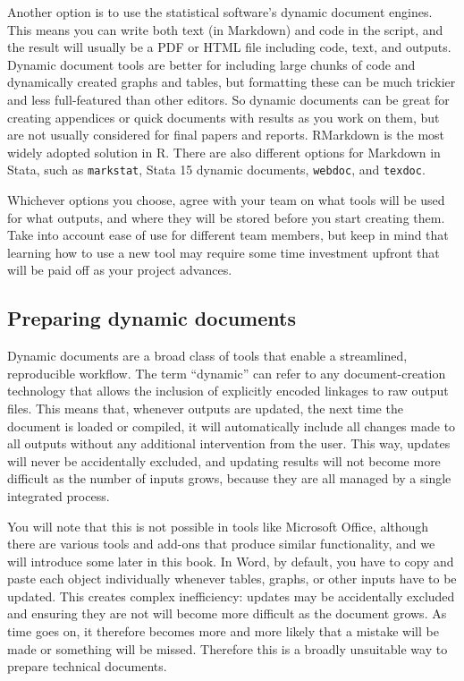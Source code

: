 Another option is to use the statistical software's dynamic document engines.
This means you can write both text (in Markdown) and code in the script,
and the result will usually be a PDF or HTML file including code, text, and outputs.
Dynamic document tools are better for including large chunks of code and dynamically created graphs and tables,
but formatting these can be much trickier and less full-featured than other editors.
So dynamic documents can be great for creating appendices
or quick documents with results as you work on them,
but are not usually considered for final papers and reports.
RMarkdown is the most widely adopted solution in R.
There are also different options for Markdown in Stata,
such as \texttt{markstat},
Stata 15 dynamic documents,
\texttt{webdoc}, and
\texttt{texdoc}.

Whichever options you choose,
agree with your team on what tools will be used for what outputs, and
where they will be stored before you start creating them.
Take into account ease of use for different team members, but
keep in mind that learning how to use a new tool may require some
time investment upfront that will be paid off as your project advances.


\subsection{Preparing dynamic documents}

Dynamic documents are a broad class of tools that enable a streamlined, reproducible workflow.
The term ``dynamic'' can refer to any document-creation technology
that allows the inclusion of explicitly encoded linkages to raw output files.
This means that, whenever outputs are updated,
the next time the document is loaded or compiled, it will automatically include
all changes made to all outputs without any additional intervention from the user.
This way, updates will never be accidentally excluded,
and updating results will not become more difficult
as the number of inputs grows,
because they are all managed by a single integrated process.

You will note that this is not possible in tools like Microsoft Office,
although there are various tools and add-ons that produce similar functionality,
and we will introduce some later in this book.
In Word, by default, you have to copy and paste each object individually
whenever tables, graphs, or other inputs have to be updated.
This creates complex inefficiency: updates may be accidentally excluded
and ensuring they are not will become more difficult as the document grows.
As time goes on, it therefore becomes more and more likely
that a mistake will be made or something will be missed.
Therefore this is a broadly unsuitable way to prepare technical documents.

